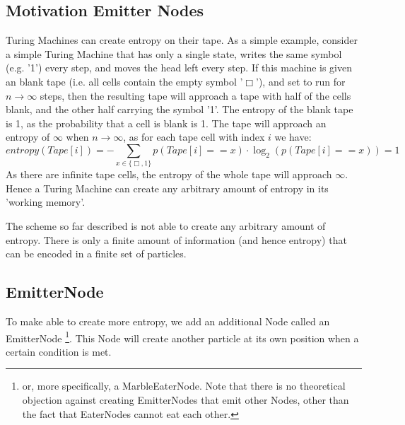 \subsection{Motivation Emitter Nodes}
Turing Machines can create entropy on their tape. As a simple example, consider a simple Turing Machine that has only a single state, writes the same symbol (e.g. '1') every step, and moves the head left every step. If this machine is given an blank tape (i.e. all cells contain the empty symbol '$\Box$'), and set to run for $n \rightarrow \infty$ steps, then the resulting tape will approach a tape with half of the cells blank, and the other half carrying the symbol '1'. The entropy of the blank tape is 1, as the probability that a cell is blank is 1. The tape will approach an entropy of $\infty$ when $n \rightarrow \infty$, as for each tape cell with index $i$ we have:
\begin{equation}
    entropy(Tape[i]) = -\sum_{x \in \{\Box, 1\}}p(Tape[i] == x)\cdot\log_2(p(Tape[i] == x)) = 1
\end{equation}
As there are infinite tape cells, the entropy of the whole tape will approach $\infty$. Hence a Turing Machine can create any arbitrary amount of entropy in its 'working memory'.

The \nenwin scheme so far described is not able to create any arbitrary amount of entropy. There is only a finite amount of information (and hence entropy) that can be encoded in a finite set of particles.

\subsection{EmitterNode}
To make \nenwin able to create more entropy, we add an additional Node called an EmitterNode \footnote{or, more specifically, a MarbleEaterNode. Note that there is no theoretical objection against creating EmitterNodes that emit other Nodes, other than the fact that EaterNodes cannot eat each other.}. This Node will create another particle at its own position when a certain condition is met.

